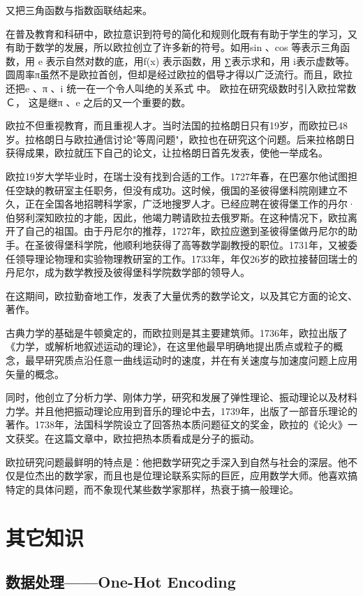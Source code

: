 \documentclass[UTF8]{ctexbook}
\begin{document}
又把三角函数与指数函联结起来。

在普及教育和科研中，欧拉意识到符号的简化和规则化既有有助于学生的学习，又有助于数学的发展，所以欧拉创立了许多新的符号。如用sin 、cos 等表示三角函数，用 e 表示自然对数的底，用f(x) 表示函数，用 ∑表示求和，用 i表示虚数等。圆周率π虽然不是欧拉首创，但却是经过欧拉的倡导才得以广泛流行。而且，欧拉还把e 、π 、i 统一在一个令人叫绝的关系式 中。 欧拉在研究级数时引入欧拉常数Ｃ， 这是继π 、e 之后的又一个重要的数。

欧拉不但重视教育，而且重视人才。当时法国的拉格朗日只有19岁，而欧拉已48岁。拉格朗日与欧拉通信讨论"等周问题"，欧拉也在研究这个问题。后来拉格朗日获得成果，欧拉就压下自己的论文，让拉格朗日首先发表，使他一举成名。

欧拉19岁大学毕业时，在瑞士没有找到合适的工作。1727年春，在巴塞尔他试图担任空缺的教研室主任职务，但没有成功。这时候，俄国的圣彼得堡科院刚建立不久，正在全国各地招聘科学家，广泛地搜罗人才。已经应聘在彼得堡工作的丹尔·伯努利深知欧拉的才能，因此，他竭力聘请欧拉去俄罗斯。在这种情况下，欧拉离开了自己的祖国。由于丹尼尔的推荐，1727年，欧拉应邀到圣彼得堡做丹尼尔的助手。在圣彼得堡科学院，他顺利地获得了高等数学副教授的职位。1731年，又被委任领导理论物理和实验物理教研室的工作。1733年，年仅26岁的欧拉接替回瑞士的丹尼尔，成为数学教授及彼得堡科学院数学部的领导人。

在这期间，欧拉勤奋地工作，发表了大量优秀的数学论文，以及其它方面的论文、著作。

古典力学的基础是牛顿奠定的，而欧拉则是其主要建筑师。1736年，欧拉出版了《力学，或解析地叙述运动的理论》，在这里他最早明确地提出质点或粒子的概念，最早研究质点沿任意一曲线运动时的速度，并在有关速度与加速度问题上应用矢量的概念。

同时，他创立了分析力学、刚体力学，研究和发展了弹性理论、振动理论以及材料力学。并且他把振动理论应用到音乐的理论中去，1739年，出版了一部音乐理论的著作。1738年，法国科学院设立了回答热本质问题征文的奖金，欧拉的《论火》一文获奖。在这篇文章中，欧拉把热本质看成是分子的振动。

欧拉研究问题最鲜明的特点是：他把数学研究之手深入到自然与社会的深层。他不仅是位杰出的数学家，而且也是位理论联系实际的巨匠，应用数学大师。他喜欢搞特定的具体问题，而不象现代某些数学家那样，热衰于搞一般理论。

\chapter{其它知识}

\section{数据处理——One-Hot Encoding}
\end{document}
